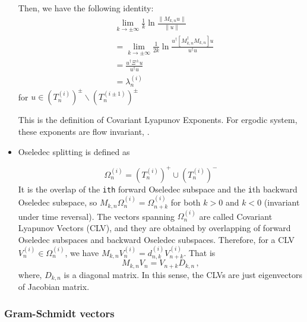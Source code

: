 \begin{itemize}
  Then, we have the following identity:
  \begin{align}
   &\lim_{k\to \pm \infty} \frac{1}{k} \ln \frac{\| M_{k,n}u \|}{\| u \|}  \\
   &=\lim_{k\to \pm \infty} \frac{1}{2k} \ln \frac{u^{\dagger}[M_{k,n}^{\dagger}M_{k,n}]u}{u^{\dagger} u}\\
   &=\frac{u^{\dagger}\Xi^{\pm}u}{u^{\dagger} u}\\
   &=\lambda_{n}^{(i)}
  \end{align}
  for $u\in (T_{n}^{(i)})^{\pm} \backslash (T_{n}^{(i\pm 1)})^{\pm}$

  This is the definition of Covariant Lyapunov Exponents. For
  ergodic system, these exponents are flow invariant,
  .
  \item Oseledec splitting is defined as

  \begin{equation}
   \Omega_{n}^{(i)}=(T_{n}^{(i)})^{+}\cup (T_{n}^{(i)})^{-}
   \label{equa::xiong_splitting}
  \end{equation}
   It is the overlap of the \texttt{ith} forward Oseledec subspace
   and the \texttt{i}th backward Oseledec subspace, so
   $M_{k,n}\Omega_{n}^{(i)}=\Omega_{n+k}^{(i)}$ for both $k>0$ and
   $k<0$ (invariant under time reversal). The vectors spanning
   ${\Omega_{n}^{(i)}}$ are called Covariant Lyapunov Vectors (CLV),
   and they are obtained by overlapping of forward Oseledec
   subspaces and backward Oseledec subspaces. Therefore, for a CLV
   $V_{n}^{(i)} \in \Omega_{n}^{(i)}$, we have
   $M_{k,n}V_{n}^{(i)}=d_{n,k}^{(i)}V_{n+k}^{(i)}$. That is
   \begin{equation}
    M_{k,n}V_{n}=V_{n+k}D_{k,n}
    \,,
    \label{eq::xiong_clv_evolve}
   \end{equation}
   where, $D_{k,n}$ is a diagonal matrix. In this sense, the CLVs are
   just eigenvectors of Jacobian matrix.

  \end{itemize}


   \subsubsection{Gram-Schmidt vectors}

